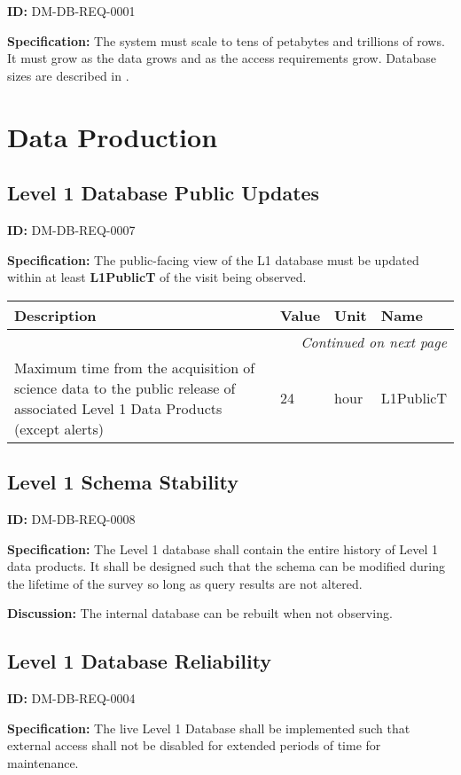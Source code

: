 \documentclass[SE,toc,lsstdraft]{lsstdoc}
\makeatletter
\newcommand{\paramname}[1]{\hspace{0pt}#1}
\newcommand{\unitname}[1]{\hspace{0pt}#1}
\newenvironment{parameters}[0]{%
\setlength\LTleft{0pt}
\setlength\LTright{\fill}
\begin{small}
\begin{longtable}[]{|p{0.49\textwidth}|l|p{0.6in}|p{1.70in}@{}|}

\hline \textbf{Description} & \textbf{Value} & \textbf{Unit} & \textbf{Name} \\ \hline
\endhead

\hline \multicolumn{4}{r}{\emph{Continued on next page}} \\
\endfoot

\hline\hline
\endlastfoot
}{%
\hline
\end{longtable}
\end{small}
}
\makeatother
\begin{document}
\label{DM-DB-REQ-0001}
\textbf{ID:} DM-DB-REQ-0001

\textbf{Specification:}
The system must scale to tens of petabytes and trillions of rows. It must grow as the data grows and as the access requirements grow. Database sizes are described in .

\section{Data Production}

\subsection{Level 1 Database Public Updates}

\label{DM-DB-REQ-0007}
\textbf{ID:} DM-DB-REQ-0007

\textbf{Specification:}
The public-facing view of the L1 database must be updated within at least \textbf{L1PublicT} of the visit being observed.

\begin{parameters}
Maximum time from the acquisition of science data to the public release of associated Level 1 Data Products (except alerts)
&
24
&
\unitname{%
hour
}
&
\paramname{%
L1PublicT
} \\\hline
\end{parameters}

\subsection{Level 1 Schema Stability}

\label{DM-DB-REQ-0008}
\textbf{ID:} DM-DB-REQ-0008

\textbf{Specification:}
The Level 1 database shall contain the entire history of Level 1 data products. It shall be designed such that the schema can be modified during the lifetime of the survey so long as query results are not altered.

\textbf{Discussion:}
The internal database can be rebuilt when not observing.

\subsection{Level 1 Database Reliability}

\label{DM-DB-REQ-0004}
\textbf{ID:} DM-DB-REQ-0004

\textbf{Specification:}
The live Level 1 Database shall be implemented such that external access shall not be disabled for extended periods of time for maintenance.
\end{document}
